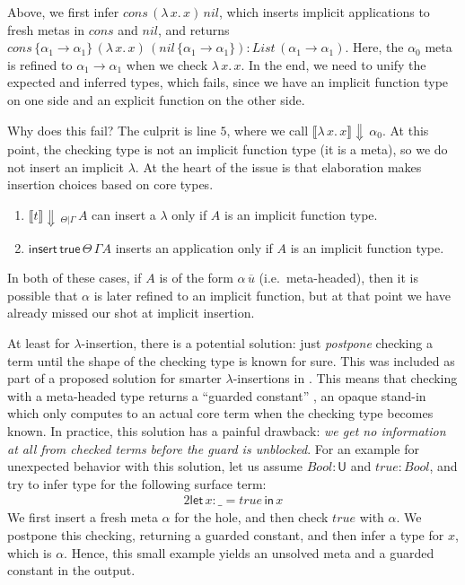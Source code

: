 \documentclass[acmsmall,review,anonymous,prologue,dvipsnames]{acmart}\settopmatter{printfolios=true,printccs=false,printacmref=false}
\newcommand{\slet}{\boldsymbol{\mathsf{let}}}
\renewcommand{\sin}{\boldsymbol{\mathsf{in}}}
\renewcommand{\U}{\mathsf{U}}
\newcommand{\echeck}[4]{\llbracket#1\rrbracket\!\Downarrow\,_{#2|#3}\,#4}
\newcommand{\echeckt}[2]{\llbracket#1\rrbracket\!\Downarrow\,#2}
\newcommand{\true}{\mathsf{true}}
\newcommand{\einsert}[3]{\mathsf{insert}\,#1\,#2\,#3}
\theoremstyle{remark}
\begin{document}
Above, we first infer $cons\,(\lambda\,x.\,x)\,nil$, which inserts implicit
applications to fresh metas in $cons$ and $nil$, and returns $cons\,\{\alpha_1
\to \alpha_1\}\,(\lambda\,x.\,x)\,(nil\,\{\alpha_1\to\alpha_1\}) :
List\,(\alpha_1\to\alpha_1)$. Here, the $\alpha_0$ meta is refined to $\alpha_1
\to \alpha_1$ when we check $\lambda\,x.\,x$. In the end, we need to unify the
expected and inferred types, which fails, since we have an implicit function
type on one side and an explicit function on the other side.

Why does this fail? The culprit is line $\scriptstyle{5}$, where we call
$\echeckt{\lambda\,x.\,x}{\alpha_0}$. At this point, the checking type is not an
implicit function type (it is a meta), so we do not insert an implicit
$\lambda$. At the heart of the issue is that elaboration makes insertion choices
based on core types.
\begin{enumerate}
\item $\echeck{t}{\Theta}{\Gamma}{A}$ can insert a $\lambda$ only if $A$ is an implicit function type.
\item $\einsert{\true}{\Theta}{\Gamma}{A}$ inserts an application only if $A$ is an implicit function type.
\end{enumerate}
In both of these cases, if $A$ is of the form $\alpha\,\overline{u}$
(i.e.\ meta-headed), then it is possible that $\alpha$ is later refined to an
implicit function, but at that point we have already missed our shot at implicit
insertion.

At least for $\lambda$-insertion, there is a potential solution: just
\emph{postpone} checking a term until the shape of the checking type is known
for sure. This was included as part of a proposed solution for smarter
$\lambda$-insertions in \cite{johansson2015eliminating}. This means that
checking with a meta-headed type returns a ``guarded constant''
\cite[Chapter~3]{norell07thesis}, an opaque stand-in which only computes to an
actual core term when the checking type becomes known. In practice, this
solution has a painful drawback: \emph{we get no information at all from checked
  terms before the guard is unblocked}. For an example for unexpected behavior
with this solution, let us assume $Bool : \U$ and $true : Bool$, and try to
infer type for the following surface term:
\begin{alignat*}{2}
  \slet\,x : \_ = true\,\sin\, x
\end{alignat*}
We first insert a fresh meta $\alpha$ for the hole, and then check $true$ with
$\alpha$. We postpone this checking, returning a guarded constant, and then
infer a type for $x$, which is $\alpha$. Hence, this small example yields an
unsolved meta and a guarded constant in the output.
\end{document}
